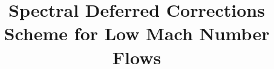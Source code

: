 \documentclass{aastex63}
\begin{document}
\title{Spectral Deferred Corrections Scheme for Low Mach Number Flows}


\end{document}
